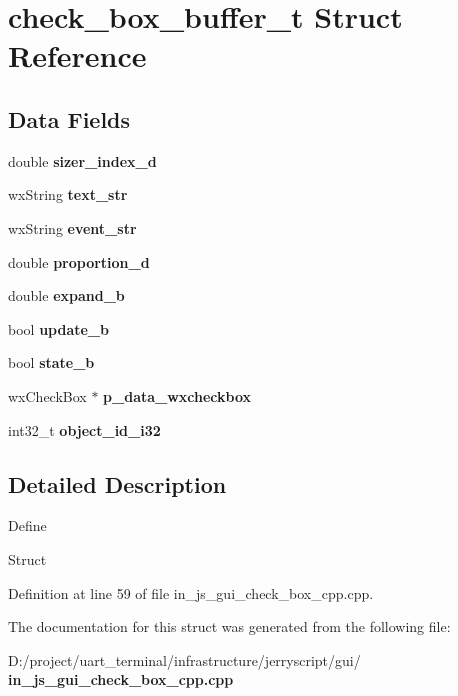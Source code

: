 \section{check\+\_\+box\+\_\+buffer\+\_\+t Struct Reference}
\label{structcheck__box__buffer__t}
\subsection*{Data Fields}
\begin{DoxyCompactItemize}
\item 
\mbox{\label{structcheck__box__buffer__t_aae99f717aadbf88f890c71a293468af8}} 
double {\bfseries sizer\+\_\+index\+\_\+d}
\item 
\mbox{\label{structcheck__box__buffer__t_ae027b01a16a8b9ded760f0ead4d7a951}} 
wx\+String {\bfseries text\+\_\+str}
\item 
\mbox{\label{structcheck__box__buffer__t_a43aba9d4f0f518678c2dd03b5bfd9e7e}} 
wx\+String {\bfseries event\+\_\+str}
\item 
\mbox{\label{structcheck__box__buffer__t_a93e3ac3895fbb25863fb66af78e0ed39}} 
double {\bfseries proportion\+\_\+d}
\item 
\mbox{\label{structcheck__box__buffer__t_a40506be5f1249944fed816e11465f5ca}} 
double {\bfseries expand\+\_\+b}
\item 
\mbox{\label{structcheck__box__buffer__t_a4aed9ad79f44786d35de6f7804904494}} 
bool {\bfseries update\+\_\+b}
\item 
\mbox{\label{structcheck__box__buffer__t_ad60c38399e569713ffb0f12e385ae907}} 
bool {\bfseries state\+\_\+b}
\item 
\mbox{\label{structcheck__box__buffer__t_a80974098335fc95203499304b1e4691f}} 
wx\+Check\+Box $\ast$ {\bfseries p\+\_\+data\+\_\+wxcheckbox}
\item 
\mbox{\label{structcheck__box__buffer__t_aa7683407966206b7eb17d410ee75d880}} 
int32\+\_\+t {\bfseries object\+\_\+id\+\_\+i32}
\end{DoxyCompactItemize}


\subsection{Detailed Description}
Define

Struct 

Definition at line 59 of file in\+\_\+js\+\_\+gui\+\_\+check\+\_\+box\+\_\+cpp.\+cpp.



The documentation for this struct was generated from the following file\+:\begin{DoxyCompactItemize}
\item 
D\+:/project/uart\+\_\+terminal/infrastructure/jerryscript/gui/\textbf{ in\+\_\+js\+\_\+gui\+\_\+check\+\_\+box\+\_\+cpp.\+cpp}\end{DoxyCompactItemize}
